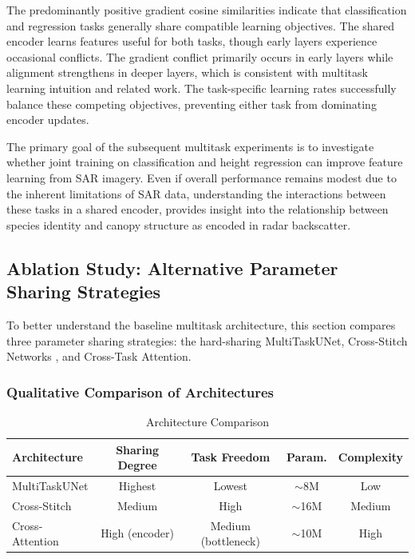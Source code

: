 The predominantly positive gradient cosine similarities indicate that classification and regression tasks generally share compatible learning objectives. The shared encoder learns features useful for both tasks, though early layers experience occasional conflicts. The gradient conflict primarily occurs in early layers while alignment strengthens in deeper layers, which is consistent with multitask learning intuition and related work. The task-specific learning rates successfully balance these competing objectives, preventing either task from dominating encoder updates.

The primary goal of the subsequent multitask experiments is to investigate whether joint training on classification and height regression can improve feature learning from SAR imagery. Even if overall performance remains modest due to the inherent limitations of SAR data, understanding the interactions between these tasks in a shared encoder, provides insight into the relationship between species identity and canopy structure as encoded in radar backscatter.

\subsection{Ablation Study: Alternative Parameter Sharing Strategies}
\label{subsec:treesat_ablation}

To better understand the baseline multitask architecture, this section compares three parameter sharing strategies: the hard-sharing MultiTaskUNet, Cross-Stitch Networks \cite{misra_cross-stitch_2016}, and Cross-Task Attention.

\subsubsection{Qualitative Comparison of Architectures}

\begin{table}[htbp]
\centering
\caption{Architecture Comparison}
\label{tab:arch_comparison}
\begin{tabular}{lcccc}
\hline
\textbf{Architecture} & \textbf{Sharing Degree} & \textbf{Task Freedom} & \textbf{Param.} & \textbf{Complexity} \\
\hline
MultiTaskUNet & Highest & Lowest & $\sim$8M & Low \\
Cross-Stitch & Medium & High & $\sim$16M & Medium \\
Cross-Attention & High (encoder) & Medium (bottleneck) & $\sim$10M & High \\
\hline
\end{tabular}
\end{table}

